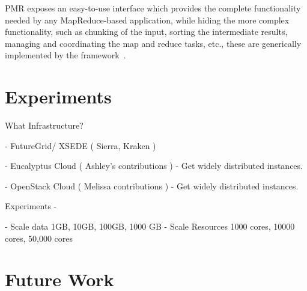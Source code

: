 \documentclass[times]{cpeauth}
\begin{document}
PMR exposes an easy-to-use interface which provides the complete
functionality needed by any MapReduce-based application, while hiding
the more complex functionality, such as chunking of the input, sorting
the intermediate results, managing and coordinating the map and reduce
tasks, etc., these are generically implemented by the
framework~\cite{pmr2012}.

\section{Experiments}

What Infrastructure?

  - FutureGrid/ XSEDE ( Sierra, Kraken )

  - Eucalyptus Cloud ( Ashley's contributions )
    - Get widely distributed instances. 

  - OpenStack Cloud ( Melissa contributions )
    - Get widely distributed instances. 

Experiments -

  - Scale data 1GB, 10GB, 100GB, 1000 GB
  - Scale Resources 1000 cores, 10000 cores, 50,000 cores

\section{Future Work}



\end{document}

